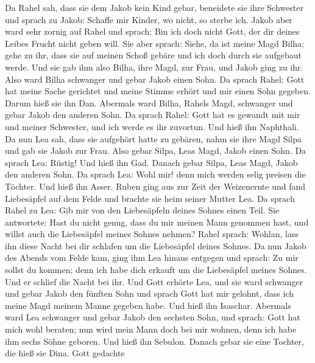  Da Rahel sah, dass sie dem Jakob kein Kind gebar,
beneidete sie ihre Schwester und sprach zu Jakob: Schaffe mir Kinder, wo
nicht, so sterbe ich.  Jakob aber ward sehr zornig auf
Rahel und sprach: Bin ich doch nicht Gott, der dir deines Leibes Frucht
nicht geben will.  Sie aber sprach: Siehe, da ist meine
Magd Bilha; gehe zu ihr, dass sie auf meinen Schoß gebäre und ich doch
durch sie aufgebaut werde.  Und sie gab ihm also Bilha,
ihre Magd, zur Frau, und Jakob ging zu ihr.  Also ward
Bilha schwanger und gebar Jakob einen Sohn.  Da sprach
Rahel: Gott hat meine Sache gerichtet und meine Stimme erhört und mir
einen Sohn gegeben. Darum hieß sie ihn Dan.  Abermals ward
Bilha, Rahels Magd, schwanger und gebar Jakob den anderen Sohn.
 Da sprach Rahel: Gott hat es gewandt mit mir und meiner
Schwester, und ich werde es ihr zuvortun. Und hieß ihn Naphthali.
 Da nun Lea sah, dass sie aufgehört hatte zu gebären, nahm
sie ihre Magd Silpa und gab sie Jakob zur Frau.  Also
gebar Silpa, Leas Magd, Jakob einen Sohn.  Da sprach Lea:
Rüstig! Und hieß ihn Gad.  Danach gebar Silpa, Leas Magd,
Jakob den anderen Sohn.  Da sprach Lea: Wohl mir! denn
mich werden selig preisen die Töchter. Und hieß ihn Asser.
 Ruben ging aus zur Zeit der Weizenernte und fand
Liebesäpfel auf dem Felde und brachte sie heim seiner Mutter Lea. Da
sprach Rahel zu Lea: Gib mir von den Liebesäpfeln deines Sohnes einen
Teil.  Sie antwortete: Hast du nicht genug, dass du mir
meinen Mann genommen hast, und willst auch die Liebesäpfel meines Sohnes
nehmen? Rahel sprach: Wohlan, lass ihn diese Nacht bei dir schlafen um
die Liebesäpfel deines Sohnes.  Da nun Jakob des Abends
vom Felde kam, ging ihm Lea hinaus entgegen und sprach: Zu mir sollst du
kommen; denn ich habe dich erkauft um die Liebesäpfel meines Sohnes. Und
er schlief die Nacht bei ihr.  Und Gott erhörte Lea, und
sie ward schwanger und gebar Jakob den fünften Sohn  und
sprach Gott hat mir gelohnt, dass ich meine Magd meinem Manne gegeben
habe. Und hieß ihn Isaschar.  Abermals ward Lea schwanger
und gebar Jakob den sechsten Sohn,  und sprach: Gott hat
mich wohl beraten; nun wird mein Mann doch bei mir wohnen, denn ich habe
ihm sechs Söhne geboren. Und hieß ihn Sebulon.  Danach
gebar sie eine Tochter, die hieß sie Dina.  Gott gedachte
